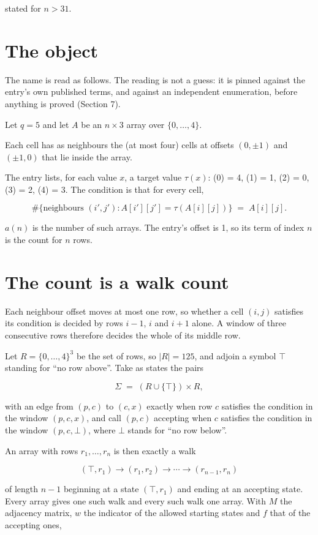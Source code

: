 \documentclass[11pt]{article}
\theoremstyle{definition}
\begin{document}
stated for $n > 31$.

\section{The object}

The name is read as follows. The reading is not a guess: it is pinned against the entry's own published terms, and against an independent enumeration, before anything is proved (Section 7).

Let $q = 5$ and let $A$ be an $n \times 3$ array over $\{0,\dots,4\}$.

Each cell has as neighbours the (at most four) cells at offsets $(0,\pm1)$ and $(\pm1,0)$ that lie inside the array.

The entry lists, for each value $x$, a target value $\tau(x)$: \tau(0) = 4, \tau(1) = 1, \tau(2) = 0, \tau(3) = 2, \tau(4) = 3. The condition is that for every cell,

\[\#\{\text{neighbours } (i',j') : A[i'][j'] = \tau(A[i][j])\} \;=\; A[i][j].\]

$a(n)$ is the number of such arrays. The entry's offset is 1, so its term of index $n$ is the count for $n$ rows.

\section{The count is a walk count}

Each neighbour offset moves at most one row, so whether a cell $(i,j)$ satisfies its condition is decided by rows $i-1$, $i$ and $i+1$ alone. A window of three consecutive rows therefore decides the whole of its middle row.

Let $R = \{0,\dots,4\}^{3}$ be the set of rows, so $|R| = 125$, and adjoin a symbol $\top$ standing for ``no row above''. Take as states the pairs

\[\Sigma \;=\; (R \cup \{\top\}) \times R,\]

with an edge from $(p,c)$ to $(c,x)$ exactly when row $c$ satisfies the condition in the window $(p,c,x)$, and call $(p,c)$ accepting when $c$ satisfies the condition in the window $(p,c,\bot)$, where $\bot$ stands for ``no row below''.

An array with rows $r_1,\dots,r_n$ is then exactly a walk

\[(\top,r_1) \to (r_1,r_2) \to \cdots \to (r_{n-1},r_n)\]

of length $n-1$ beginning at a state $(\top,r_1)$ and ending at an accepting state. Every array gives one such walk and every such walk one array. With $M$ the adjacency matrix, $w$ the indicator of the allowed starting states and $f$ that of the accepting ones,
\end{document}
